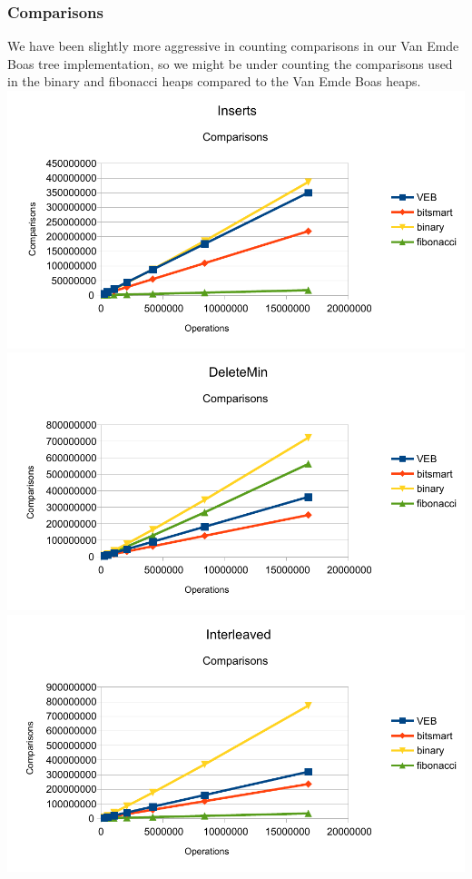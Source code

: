 \subsubsection{Comparisons}
We have been slightly more aggressive in counting comparisons in our Van Emde Boas tree implementation, so we might be under counting the comparisons used in the binary and fibonacci heaps compared to the Van Emde Boas heaps.\\
\includegraphics[width=\textwidth]{graphs/Inserts_comparisons.pdf}
\includegraphics[width=\textwidth]{graphs/DeleteMin_comparisons.pdf}
\includegraphics[width=\textwidth]{graphs/Interleaved_comparisons.pdf}

